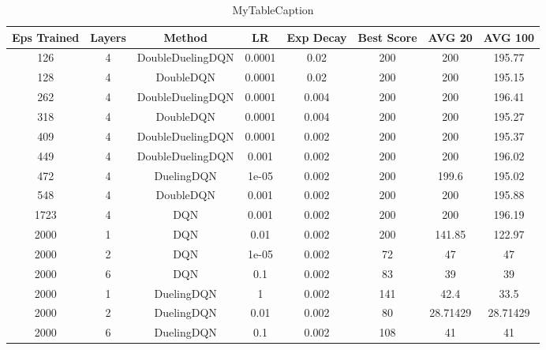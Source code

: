 \begin{table*}
\centering
\begin{tabular}{|c|c|c|c|c|c|c|c|}
\hline
Eps Trained & Layers & Method & LR & Exp Decay & Best Score & AVG 20 & AVG 100 \\
\hline
126 & 4 & DoubleDuelingDQN & 0.0001 & 0.02 & 200 & 200 & 195.77 \\
\hline
128 & 4 & DoubleDQN & 0.0001 & 0.02 & 200 & 200 & 195.15 \\
\hline
262 & 4 & DoubleDuelingDQN & 0.0001 & 0.004 & 200 & 200 & 196.41 \\
\hline
318 & 4 & DoubleDQN & 0.0001 & 0.004 & 200 & 200 & 195.27 \\
\hline
409 & 4 & DoubleDuelingDQN & 0.0001 & 0.002 & 200 & 200 & 195.37 \\
\hline
449 & 4 & DoubleDuelingDQN & 0.001 & 0.002 & 200 & 200 & 196.02 \\
\hline
472 & 4 & DuelingDQN & 1e-05 & 0.002 & 200 & 199.6 & 195.02 \\
\hline
548 & 4 & DoubleDQN & 0.001 & 0.002 & 200 & 200 & 195.88 \\
\hline
1723 & 4 & DQN & 0.001 & 0.002 & 200 & 200 & 196.19 \\
\hline
2000 & 1 & DQN & 0.01 & 0.002 & 200 & 141.85 & 122.97 \\
\hline
2000 & 2 & DQN & 1e-05 & 0.002 & 72 & 47 & 47 \\
\hline
2000 & 6 & DQN & 0.1 & 0.002 & 83 & 39 & 39 \\
\hline
2000 & 1 & DuelingDQN & 1 & 0.002 & 141 & 42.4 & 33.5 \\
\hline
2000 & 2 & DuelingDQN & 0.01 & 0.002 & 80 & 28.71429 & 28.71429 \\
\hline
2000 & 6 & DuelingDQN & 0.1 & 0.002 & 108 & 41 & 41 \\
\hline
\end{tabular}
\caption{MyTableCaption}
\label{table:MyTableLabel}
\end{table*}
